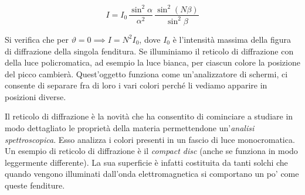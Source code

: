 \[
	\boxed{I=I_0\,\frac{\sin^2 \alpha}{\alpha^2}\,\frac{\sin^2 (N\beta)}{\sin^2 \beta}}
\]

Si verifica che per $\vartheta=0 \implies I=N^2 I_0 $, dove $I_0$ è l'intensità massima della figura di diffrazione della singola fenditura.
Se illuminiamo il reticolo di diffrazione con della luce policromatica, ad esempio la luce bianca, per ciascun colore la posizione del picco cambierà. Quest'oggetto funziona come un'analizzatore di schermi, ci consente di separare fra di loro i vari colori perché li vediamo apparire in posizioni diverse.

Il reticolo di diffrazione è la novità che ha consentito di cominciare a studiare in modo dettagliato le proprietà della materia permettendone un'\emph{analisi spettroscopica}. Esso analizza i colori presenti in un fascio di luce monocromatica. Un esempio di reticolo di diffrazione è il \emph{compact disc} (anche se funziona in modo leggermente differente). La sua superficie è infatti costituita da tanti solchi che quando vengono illuminati dall'onda elettromagnetica si comportano un po' come queste fenditure.